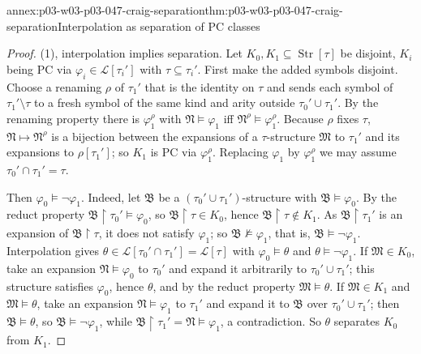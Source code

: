 \begin{annexitem}{annex:p03-w03-p03-047-craig-separation}{thm:p03-w03-p03-047-craig-separation}{Interpolation as separation of PC classes}
\begin{proof}
(1), interpolation implies separation.  Let \(K_0,K_1\subseteq
\operatorname{Str}[\tau]\) be disjoint, \(K_i\) being PC via
\(\varphi_i\in\mathscr L[\tau_i']\) with \(\tau\subseteq\tau_i'\).  First
make the added symbols disjoint.  Choose a renaming \(\rho\) of \(\tau_1'\)
that is the identity on \(\tau\) and sends each symbol of
\(\tau_1'\setminus\tau\) to a fresh symbol of the same kind and arity outside
\(\tau_0'\cup\tau_1'\).  By the renaming property there is \(\varphi_1^\rho\)
with \(\mathfrak N\models\varphi_1\) iff \(\mathfrak N^\rho\models\varphi_1^\rho\).
Because \(\rho\) fixes \(\tau\), \(\mathfrak N\mapsto\mathfrak N^\rho\) is a
bijection between the expansions of a \(\tau\)-structure \(\mathfrak M\) to
\(\tau_1'\) and its expansions to \(\rho[\tau_1']\); so \(K_1\) is PC via
\(\varphi_1^\rho\).  Replacing \(\varphi_1\) by \(\varphi_1^\rho\) we may
assume \(\tau_0'\cap\tau_1'=\tau\).

Then \(\varphi_0\models\neg\varphi_1\).  Indeed, let \(\mathfrak B\) be a
\((\tau_0'\cup\tau_1')\)-structure with \(\mathfrak B\models\varphi_0\).  By
the reduct property \(\mathfrak B\restriction\tau_0'\models\varphi_0\), so
\(\mathfrak B\restriction\tau\in K_0\), hence
\(\mathfrak B\restriction\tau\notin K_1\).  As \(\mathfrak B\restriction\tau_1'\)
is an expansion of \(\mathfrak B\restriction\tau\), it does not satisfy
\(\varphi_1\); so \(\mathfrak B\not\models\varphi_1\), that is,
\(\mathfrak B\models\neg\varphi_1\).  Interpolation gives
\(\theta\in\mathscr L[\tau_0'\cap\tau_1']=\mathscr L[\tau]\) with
\(\varphi_0\models\theta\) and \(\theta\models\neg\varphi_1\).  If
\(\mathfrak M\in K_0\), take an expansion \(\mathfrak N\models\varphi_0\) to
\(\tau_0'\) and expand it arbitrarily to \(\tau_0'\cup\tau_1'\); this
structure satisfies \(\varphi_0\), hence \(\theta\), and by the reduct
property \(\mathfrak M\models\theta\).  If \(\mathfrak M\in K_1\) and
\(\mathfrak M\models\theta\), take an expansion \(\mathfrak N\models\varphi_1\)
to \(\tau_1'\) and expand it to \(\mathfrak B\) over
\(\tau_0'\cup\tau_1'\); then \(\mathfrak B\models\theta\), so
\(\mathfrak B\models\neg\varphi_1\), while
\(\mathfrak B\restriction\tau_1'=\mathfrak N\models\varphi_1\), a
contradiction.  So \(\theta\) separates \(K_0\) from \(K_1\).


\end{proof}
\end{annexitem}

